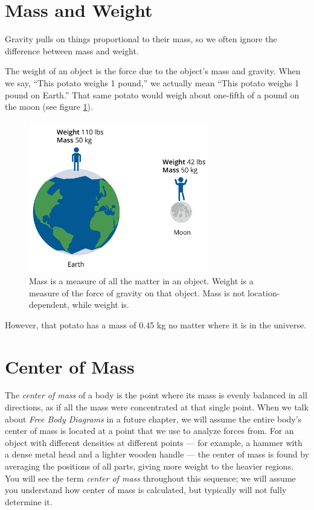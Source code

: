 \section{Mass and Weight}

Gravity pulls on things proportional to their mass, so we often
ignore the difference between mass and weight.

The weight of an object is the force due to the object's mass and
gravity. When we say, ``This potato weighs 1 pound,'' we actually mean
``This potato weighs 1 pound on Earth.'' That same potato would weigh
about one-fifth of a pound on the moon (see figure \ref{fig:massvweight}).

\begin{figure}[htbp]
\centering
\includegraphics[width=0.7\textwidth]{massvweight.png}
\caption{Mass is a measure of all the matter in an object. Weight is a measure of 
the force of gravity on that object. Mass is not location-dependent, while weight 
is.}
\label{fig:massvweight}
\end{figure}

However, that potato has a mass of 0.45 kg no matter where it is in the universe.
\section{Center of Mass}
The \emph{center of mass} of a body is the point where its mass is evenly balanced in all directions, as if all the mass were concentrated at that single point. When we talk about \emph{Free Body Diagrams} in a future chapter, we will assume the entire body's center of mass is located at a point that we use to analyze forces from. For an object with different densities at different points — for example, a hammer with a dense metal head and a lighter wooden handle — the center of mass is found by averaging the positions of all parts, giving more weight to the heavier regions. You will see the term \emph{center of mass} throughout this sequence; we will assume you understand how center of mass is calculated, but typically will not fully determine it.

